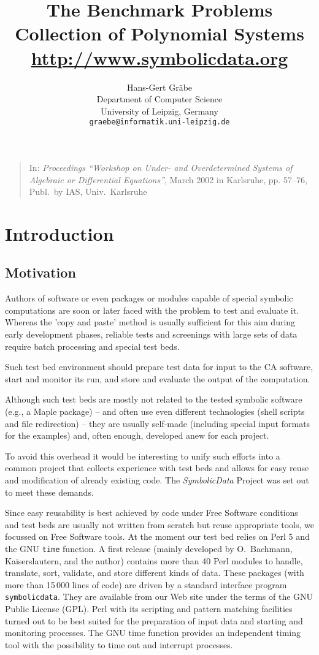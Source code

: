 \documentclass[11pt]{article}
\date{}
\title{The {\SD} Benchmark Problems\\ Collection of Polynomial
Systems\\[12pt] {\large\url{http://www.symbolicdata.org}} }
\author{
Hans-Gert Gr\"abe\\
Department of Computer Science\\
University of Leipzig, Germany\\
{\tt graebe@informatik.uni-leipzig.de}
}
\newcommand{\SD}{{\em Symbo\-lic\-Data}}
\begin{document}
\maketitle
\begin{quote}\small 
  In: {\em Proceedings ``Workshop on Under- and Overdetermined Systems of
    Algebraic or Differential Equations''}, March 2002 in Karlsruhe,
  pp. 57--76, Publ.\ by IAS, Univ.\ Karlsruhe
\end{quote}

\section{Introduction}

\subsection{Motivation}

Authors of software or even packages or modules capable of special
symbolic computations are soon or later faced with the problem to test
and evaluate it.  Whereas the 'copy and paste' method is usually
sufficient for this aim during early development phases, reliable
tests and screenings with large sets of data require batch processing
and special test beds.

Such test bed environment should prepare test data for input to the CA
software, start and monitor its run, and store and evaluate the output
of the computation.

Although such test beds are mostly not related to the tested
symbolic software (e.g., a Maple package) -- and often use even
different technologies (shell scripts and file redirection) --
they are usually self-made (including special input formats for
the examples) and, often enough, developed anew for each project.

To avoid this overhead it would be interesting to unify such efforts
into a common project that collects experience with test beds and
allows for easy reuse and modification of already existing code.  The
{\SD} Project was set out to meet these demands.

Since easy reusability is best achieved by code under Free Software
conditions and test beds are usually not written from scratch but
reuse appropriate tools, we focussed on Free Software tools.  At the
moment our test bed relies on Perl 5 and the GNU {\tt time} function.
A first release (mainly developed by O.~Bachmann, Kaiserslautern, and
the author) contains more than 40 Perl modules to handle, translate,
sort, validate, and store different kinds of data.  These packages
(with more than 15\,000 lines of code) are driven by a standard
interface program {\tt symbolicdata}.  They are available from our Web
site under the terms of the GNU Public License (GPL). Perl with its
scripting and pattern matching facilities turned out to be best suited
for the preparation of input data and starting and monitoring
processes.  The GNU {time} function provides an independent timing
tool with the possibility to time out and interrupt processes.
\end{document}
